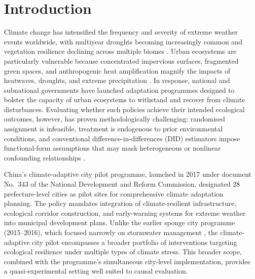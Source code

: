 \section{Introduction}
\label{sec:introduction}

Climate change has intensified the frequency and severity of extreme
weather events worldwide, with multiyear droughts becoming increasingly
common and vegetation resilience declining across multiple biomes
\citep{chen2025global,smith2023global}. Urban ecosystems are
particularly vulnerable because concentrated impervious surfaces,
fragmented green spaces, and anthropogenic heat amplification magnify
the impacts of heatwaves, droughts, and extreme precipitation
\citep{ipcc2023cities}. In response, national and subnational
governments have launched adaptation programmes designed to bolster
the capacity of urban ecosystems to withstand and recover from climate
disturbances. Evaluating whether such policies achieve their intended
ecological outcomes, however, has proven methodologically challenging:
randomised assignment is infeasible, treatment is endogenous to prior
environmental conditions, and conventional difference-in-differences
(DID) estimators impose functional-form assumptions that may mask
heterogeneous or nonlinear confounding relationships
\citep{rambachan2023more,chaisemartin2023twoway}.

China's climate-adaptive city pilot programme, launched in 2017 under
document No.~343 of the National Development and Reform Commission,
designated 28 prefecture-level cities as pilot sites for comprehensive
climate adaptation planning. The policy mandates integration of
climate-resilient infrastructure, ecological corridor construction,
and early-warning systems for extreme weather into municipal development
plans. Unlike the earlier sponge city programme (2015--2016), which
focused narrowly on stormwater management \citep{han2023chinas}, the
climate-adaptive city pilot encompasses a broader portfolio of
interventions targeting ecological resilience under multiple types of
climate stress. This broader scope, combined with the programme's
simultaneous city-level implementation, provides a quasi-experimental
setting well suited to causal evaluation.

